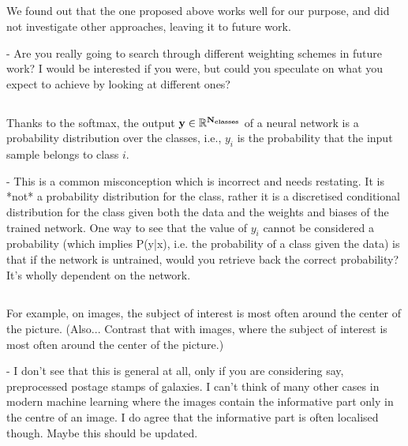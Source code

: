 \documentclass[12pt,a4paper]{article}
\newcommand{\nati}[1]{{\color[rgb]{.1,.6,.1}{NP: #1}}}
\newcommand{\todo}[1]{{\color[rgb]{.6,.1,.6}{TODO: #1}}}
\begin{document}
\todo{Very good question: but too complex answer for this paper. This is kept for a future contribution. + explain why}

\subsection{}

\begin{mdframed}[style=comment] 
We found out that the one proposed above works well for our purpose, and did not investigate other approaches, leaving it to future work.

- Are you really going to search through different weighting schemes in future work? I would be interested if you were, but could you speculate on what you expect to achieve by looking at different ones?
\end{mdframed}

\todo{Yes, it is likely that we are, + graph learning?}

\subsection{}
\begin{mdframed}[style=comment] 
Thanks to the softmax, the output $\bf{y}\in\mathbb{R}^{N_{classes}}$ of a neural network is a probability distribution over the classes, i.e., $y_i$ is the probability that the input sample belongs to class $i$.

- This is a common misconception which is incorrect and needs restating. It is *not* a probability distribution for the class, rather it is a discretised conditional distribution for the class given both the data and the weights and biases of the trained network. One way to see that the value of $y_i$ cannot be considered a probability (which implies P(y|x), i.e. the probability of a class given the data) is that if the network is untrained, would you retrieve back the correct probability? It's wholly dependent on the network.
\end{mdframed}
\nati{I totally agree with the reviewer, but I think this is only a formulation issue. By the way, this mean that the reviewer is knowledgable with ML, and may be Bayesian. He might be working on another spherical approach.}

\subsection{}
\begin{mdframed}[style=comment] 
For example, on images, the subject of interest is most often around the center of the picture. (Also... Contrast that with images, where the subject of interest is most often around the center of the picture.)

- I don't see that this is general at all, only if you are considering say, preprocessed postage stamps of galaxies. I can't think of many other cases in modern machine learning where the images contain the informative part only in the centre of an image. I do agree that the informative part is often localised though. Maybe this should be updated. 
\end{mdframed}
\todo{Answer}
\end{document}
